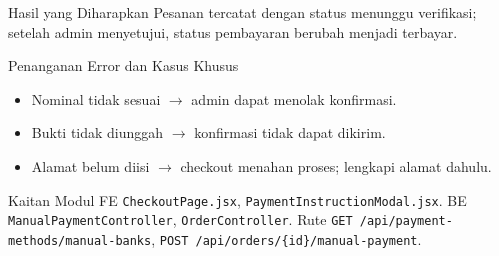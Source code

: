 
\begin{flowsection}{Hasil yang Diharapkan}
Pesanan tercatat dengan status menunggu verifikasi; setelah admin menyetujui,
status pembayaran berubah menjadi terbayar.
\end{flowsection}

\begin{flowsection}{Penanganan Error dan Kasus Khusus}
\begin{itemize}
  \item Nominal tidak sesuai $\rightarrow$ admin dapat menolak konfirmasi.
  \item Bukti tidak diunggah $\rightarrow$ konfirmasi tidak dapat dikirim.
  \item Alamat belum diisi $\rightarrow$ checkout menahan proses; lengkapi alamat dahulu.
\end{itemize}
\end{flowsection}

\begin{flowsection}{Kaitan Modul}
FE \texttt{CheckoutPage.jsx}, \texttt{PaymentInstructionModal.jsx}. BE
\texttt{ManualPaymentController}, \texttt{OrderController}. Rute
\texttt{GET /api/payment-methods/manual-banks}, \texttt{POST /api/orders/\{id\}/manual-payment}.
\end{flowsection}

